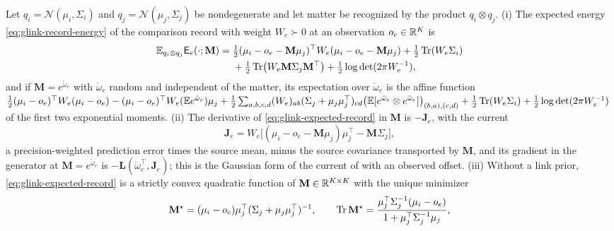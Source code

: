 Let \(q_i=\mathcal N(\mu_i,\Sigma_i)\) and \(q_j=\mathcal N(\mu_j,\Sigma_j)\) be nondegenerate and
let matter be recognized by the product \(q_i\otimes q_j\). (i) The expected energy
\eqref{eq:glink-record-energy} of the comparison record with weight \(W_e\succ0\) at an observation
\(o_e\in\mathbb R^K\) is
\begin{equation}
\begin{aligned}
\mathbb E_{q_i\otimes q_j}\mathsf E_e(\cdot;\mathbf M)
={}&\tfrac12(\mu_i-o_e-\mathbf M\mu_j)^\top W_e(\mu_i-o_e-\mathbf M\mu_j)+\tfrac12\operatorname{Tr}(W_e\Sigma_i)\\
&+\tfrac12\operatorname{Tr}\bigl(W_e\mathbf M\Sigma_j\mathbf M^\top\bigr)+\tfrac12\log\det(2\pi W_e^{-1}),
\end{aligned}
\label{eq:glink-expected-record}
\end{equation}
and if \(\mathbf M=e^{\mathring\omega_e}\) with \(\mathring\omega_e\) random and independent of the
matter, its expectation over \(\mathring\omega_e\) is the affine function
\(\tfrac12(\mu_i-o_e)^\top W_e(\mu_i-o_e)-(\mu_i-o_e)^\top W_e(\mathbb E e^{\mathring\omega_e})\mu_j
+\tfrac12\sum_{a,b,c,d}(W_e)_{ab}(\Sigma_j+\mu_j\mu_j^\top)_{cd}\bigl(\mathbb E[e^{\mathring\omega_e}\otimes e^{\mathring\omega_e}]\bigr)_{(b,a),(c,d)}
+\tfrac12\operatorname{Tr}(W_e\Sigma_i)+\tfrac12\log\det(2\pi W_e^{-1})\)
of the first two exponential moments.
(ii) The derivative of \eqref{eq:glink-expected-record} in \(\mathbf M\) is \(-\mathbf J_e\), with the
current
\begin{equation}
\mathbf J_e=W_e\bigl[(\mu_i-o_e-\mathbf M\mu_j)\mu_j^\top-\mathbf M\Sigma_j\bigr],
\label{eq:glink-current}
\end{equation}
a precision-weighted prediction error times the source mean, minus the source covariance
transported by \(\mathbf M\), and its gradient in the generator at \(\mathbf M=e^{\mathring\omega_e}\)
is \(-\mathbf L(\mathring\omega_e^\top,\mathbf J_e)\); this is the Gaussian form of the current of
 with an observed offset.
(iii) Without a link prior, \eqref{eq:glink-expected-record} is a strictly convex quadratic
function of \(\mathbf M\in\mathbb R^{K\times K}\) with the unique minimizer
\begin{equation}
\mathbf M^\star=(\mu_i-o_e)\mu_j^\top(\Sigma_j+\mu_j\mu_j^\top)^{-1},
\qquad
\operatorname{Tr}\mathbf M^\star=\frac{\mu_j^\top\Sigma_j^{-1}(\mu_i-o_e)}{1+\mu_j^\top\Sigma_j^{-1}\mu_j},
\label{eq:glink-rank-one}
\end{equation}
